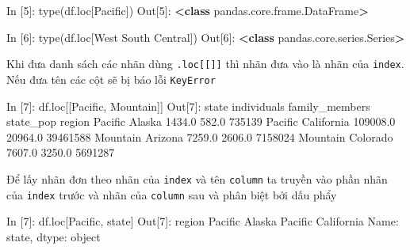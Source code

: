 \documentclass[
]{book}
\newenvironment{Shaded}{\begin{snugshade}}{\end{snugshade}}
\newcommand{\BuiltInTok}[1]{#1}
\newcommand{\DecValTok}[1]{\textcolor[rgb]{0.00,0.00,0.81}{#1}}
\newcommand{\FloatTok}[1]{\textcolor[rgb]{0.00,0.00,0.81}{#1}}
\newcommand{\KeywordTok}[1]{\textcolor[rgb]{0.13,0.29,0.53}{\textbf{#1}}}
\newcommand{\NormalTok}[1]{#1}
\newcommand{\OperatorTok}[1]{\textcolor[rgb]{0.81,0.36,0.00}{\textbf{#1}}}
\newcommand{\StringTok}[1]{\textcolor[rgb]{0.31,0.60,0.02}{#1}}
\begin{document}
\begin{Shaded}
\begin{Highlighting}[]
\NormalTok{In [}\DecValTok{5}\NormalTok{]: }\BuiltInTok{type}\NormalTok{(df.loc[}\StringTok{\textquotesingle{}Pacific\textquotesingle{}}\NormalTok{])}
\NormalTok{Out[}\DecValTok{5}\NormalTok{]: }
\OperatorTok{\textless{}}\KeywordTok{class} \StringTok{\textquotesingle{}pandas.core.frame.DataFrame\textquotesingle{}}\OperatorTok{\textgreater{}}

\NormalTok{In [}\DecValTok{6}\NormalTok{]: }\BuiltInTok{type}\NormalTok{(df.loc[}\StringTok{\textquotesingle{}West South Central\textquotesingle{}}\NormalTok{])}
\NormalTok{Out[}\DecValTok{6}\NormalTok{]: }
\OperatorTok{\textless{}}\KeywordTok{class} \StringTok{\textquotesingle{}pandas.core.series.Series\textquotesingle{}}\OperatorTok{\textgreater{}}
\end{Highlighting}
\end{Shaded}

Khi đưa danh sách các nhãn dùng \texttt{.loc{[}{[}{]}{]}} thì nhãn đưa vào là nhãn của \texttt{index}. Nếu đưa tên các cột sẽ bị báo lỗi \texttt{KeyError}

\begin{Shaded}
\begin{Highlighting}[]
\NormalTok{In [}\DecValTok{7}\NormalTok{]: df.loc[[}\StringTok{\textquotesingle{}Pacific\textquotesingle{}}\NormalTok{, }\StringTok{\textquotesingle{}Mountain\textquotesingle{}}\NormalTok{]]}
\NormalTok{Out[}\DecValTok{7}\NormalTok{]:}
\NormalTok{               state  individuals  family\_members  state\_pop}
\NormalTok{region                                                      }
\NormalTok{Pacific       Alaska       }\FloatTok{1434.0}           \FloatTok{582.0}     \DecValTok{735139}
\NormalTok{Pacific   California     }\FloatTok{109008.0}         \FloatTok{20964.0}   \DecValTok{39461588}
\NormalTok{Mountain     Arizona       }\FloatTok{7259.0}          \FloatTok{2606.0}    \DecValTok{7158024}
\NormalTok{Mountain    Colorado       }\FloatTok{7607.0}          \FloatTok{3250.0}    \DecValTok{5691287}
\end{Highlighting}
\end{Shaded}

Để lấy nhãn đơn theo nhãn của \texttt{index} và tên \texttt{column} ta truyền vào phần nhãn của \texttt{index} trước và nhãn của \texttt{column} sau và phân biệt bởi dấu phẩy

\begin{Shaded}
\begin{Highlighting}[]
\NormalTok{In [}\DecValTok{7}\NormalTok{]: df.loc[}\StringTok{\textquotesingle{}Pacific\textquotesingle{}}\NormalTok{, }\StringTok{\textquotesingle{}state\textquotesingle{}}\NormalTok{]}
\NormalTok{Out[}\DecValTok{7}\NormalTok{]:}
\NormalTok{region}
\NormalTok{Pacific        Alaska}
\NormalTok{Pacific    California}
\NormalTok{Name: state, dtype: }\BuiltInTok{object}
\end{Highlighting}
\end{Shaded}
\end{document}
